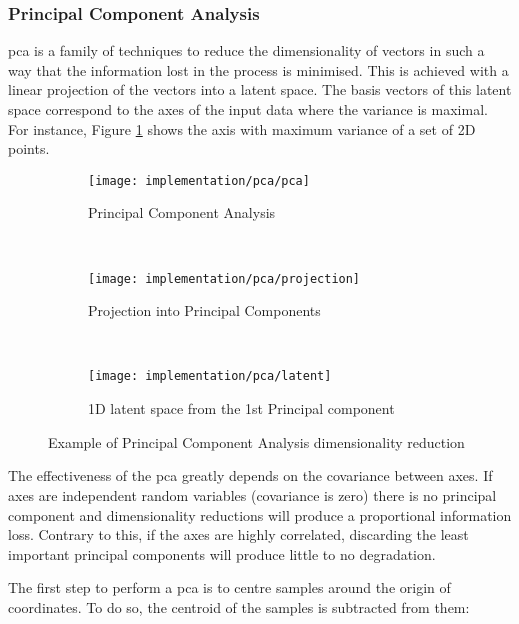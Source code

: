 \documentclass[../main.tex]{subfiles}
\begin{document}
\subsubsection{Principal Component Analysis}
\Gls{pca} is a family of techniques to reduce the dimensionality of vectors in such a way that the information lost in the process is minimised\cite{shalizi2012}. This is achieved with a linear projection of the vectors into a latent space. The basis vectors of this latent space correspond to the axes of the input data where the variance is maximal. For instance, Figure \ref{fig:4:pca} shows the axis with maximum variance of a set of 2D points.

\begin{figure}[htbp]
    \centering
    \begin{subfigure}[b]{\textwidth}
         \centering
         \texttt{[image: implementation/pca/pca]}
         \caption{Principal Component Analysis}
    \end{subfigure}\\
    \vspace{2em}
    \begin{subfigure}[b]{\textwidth}
         \centering
         \texttt{[image: implementation/pca/projection]}
         \caption{Projection into Principal Components}
    \end{subfigure}\\
    \vspace{2em}
    \begin{subfigure}[b]{\textwidth}
         \centering
         \texttt{[image: implementation/pca/latent]}
         \caption{1D latent space from the 1st Principal component}
    \end{subfigure}

    \caption{Example of Principal Component Analysis dimensionality reduction}
    \label{fig:4:pca}
\end{figure}

The effectiveness of the \gls{pca} greatly depends on the covariance between axes. If axes are independent random variables (covariance is zero) there is no principal component and dimensionality reductions will produce a proportional information loss. Contrary to this, if the axes are highly correlated, discarding the least important principal components will produce little to no degradation\cite{shalizi2012}\cite{jolliffe2002}.

The first step to perform a \gls{pca} is to centre samples around the origin of coordinates. To do so, the centroid of the samples is subtracted from them:
\end{document}
